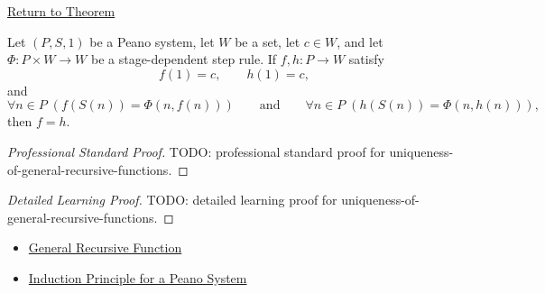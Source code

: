 \newpage
{}
\label{prf:uniqueness-of-general-recursive-functions}

\begin{remark*}[Return]
\hyperref[lem:uniqueness-of-general-recursive-functions]{Return to Theorem}
\end{remark*}

\begin{lemma*}
Let $(P,S,1)$ be a Peano system, let $W$ be a set, let $c\in W$, and let
$\Phi:P\times W\to W$ be a stage-dependent step rule. If $f,h:P\to W$ satisfy
\[
f(1)=c,\qquad h(1)=c,
\]
and
\[
\forall n\in P\;(f(S(n))=\Phi(n,f(n)))
\qquad\text{and}\qquad
\forall n\in P\;(h(S(n))=\Phi(n,h(n))),
\]
then $f=h$.
\end{lemma*}

\begin{proof}[Professional Standard Proof]
\LRAProofBodyStart
TODO: professional standard proof for uniqueness-of-general-recursive-functions.
\end{proof}

\begin{proof}[Detailed Learning Proof]
\LRAProofBodyStart
TODO: detailed learning proof for uniqueness-of-general-recursive-functions.
\end{proof}

\begin{remark*}
\end{remark*}

\begin{dependencies}
\begin{itemize}
  \item \hyperref[def:general-recursive-function]{General Recursive Function}
  \item \hyperref[thm:induction-principle-for-peano-system]{Induction Principle for a Peano System}
\end{itemize}
\end{dependencies}

\clearpage
